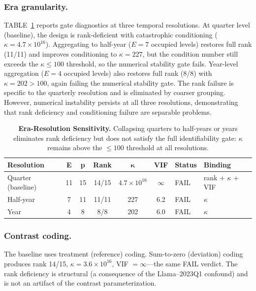 \documentclass{ieeeaccess}
\theoremstyle{definition}
\theoremstyle{plain}
\begin{document}
\subsubsection{Era granularity.} TABLE~\ref{tab:era_res} reports gate diagnostics at three temporal resolutions. At quarter level (baseline), the design is rank-deficient with catastrophic conditioning ($\kappa = 4.7 \times 10^{16}$). Aggregating to half-year ($E = 7$ occupied levels) restores full rank (11/11) and improves conditioning to $\kappa = 227$, but the condition number still exceeds the $\kappa \leq 100$ threshold, so the numerical stability gate fails. Year-level aggregation ($E = 4$ occupied levels) also restores full rank (8/8) with $\kappa = 202 > 100$, again failing the numerical stability gate. The rank failure is specific to the quarterly resolution and is eliminated by coarser grouping. However, numerical instability persists at all three resolutions, demonstrating that rank deficiency and conditioning failure are separable problems.

\begin{table}[!t]
\caption{\textbf{Era-Resolution Sensitivity.} Collapsing quarters to half-years or years eliminates rank deficiency but does not satisfy the full identifiability gate: $\kappa$ remains above the $\leq 100$ threshold at all resolutions.}
\label{tab:era_res}
\centering
\begin{tabular}{l c c c c c l l}
\hline
\textbf{Resolution} & \textbf{E} & \textbf{p} & \textbf{Rank} & $\boldsymbol{\kappa}$ & \textbf{VIF} & \textbf{Status} & \textbf{Binding} \\
\hline
Quarter (baseline) & 11 & 15 & 14/15 & $4.7\!\times\!10^{16}$ & $\infty$ & FAIL & rank + $\kappa$ + VIF \\
\hline
Half-year & 7 & 11 & 11/11 & 227 & 6.2 & FAIL & $\kappa$ \\
\hline
Year & 4 & 8 & 8/8 & 202 & 6.0 & FAIL & $\kappa$ \\
\hline
\end{tabular}
\end{table}

\subsubsection{Contrast coding.} The baseline uses treatment (reference) coding. Sum-to-zero (deviation) coding produces rank 14/15, $\kappa = 3.6 \times 10^{16}$, VIF $= \infty$---the same FAIL verdict. The rank deficiency is structural (a consequence of the Llama--2023Q1 confound) and is not an artifact of the contrast parameterization.
\end{document}
